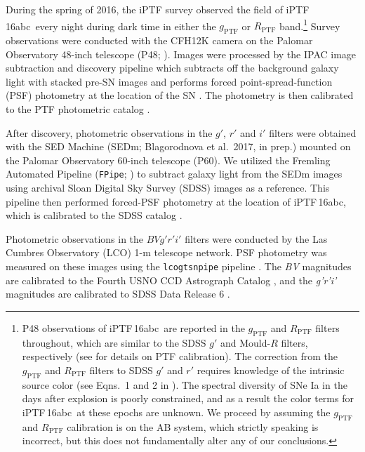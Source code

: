 \documentclass[twocolumn]{aastex61}
\newcommand{\abc}{iPTF\,16abc}
\begin{document}
During the spring of 2016, the iPTF survey observed the field of \abc\ every night during dark time in either the $g_\mathrm{PTF}$ or 
$R_\mathrm{PTF}$ band.\footnote{P48 observations of \abc\ are reported in the $g_\mathrm{PTF}$ and $R_\mathrm{PTF}$ filters throughout, which are similar to the SDSS $g'$ and Mould-$R$ filters, respectively (see \citealt{2012PASP..124..854O} for details on PTF calibration). The correction from the $g_\mathrm{PTF}$ and $R_\mathrm{PTF}$ filters to SDSS $g'$ and $r'$ requires knowledge of the intrinsic source color (see Eqns.~1 and 2 in \citealt{2012PASP..124..854O}). The spectral diversity of SNe Ia in the days after explosion is poorly constrained, and as a result the color terms for \abc\ at these epochs are unknown. We proceed by assuming the $g_\mathrm{PTF}$ and $R_\mathrm{PTF}$ calibration is on the AB system, which strictly speaking is incorrect, but this does not fundamentally alter any of our conclusions.} 
Survey observations were conducted with the
CFH12K camera \citep{2008SPIE.7014E..4YR} on the Palomar Observatory 
48-inch telescope (P48; \citealt{2009PASP..121.1395L}). Images were processed by the IPAC image
subtraction and discovery pipeline which subtracts off the background
galaxy light with stacked pre-SN images and performs forced
point-spread-function (PSF) photometry at the location of the SN 
\citep{2017PASP..129a4002M}. The
photometry is then calibrated to the PTF photometric catalog
\citep{2012PASP..124..854O}.

After discovery, photometric observations in the $g'$, $r'$ and $i'$
filters were obtained with the SED Machine 
(SEDm; Blagorodnova et al.\ 2017, in prep.) mounted on the Palomar Observatory 
60-inch telescope (P60). We utilized the Fremling Automated Pipeline (\texttt{FPipe}; \citealt{2016A&A...593A..68F}) to subtract galaxy light from the SEDm images using archival Sloan Digital Sky Survey (SDSS) images as a reference. This pipeline then performed forced-PSF photometry at the location of \abc, which is calibrated to the SDSS catalog \citep{2014ApJS..211...17A}.

Photometric observations in the $BVg'r'i'$ filters were conducted by the Las Cumbres Observatory (LCO) 1-m
telescope network.  PSF photometry was measured on these images using
the \texttt{lcogtsnpipe} pipeline \citep{2016MNRAS.459.3939V}. The
\textit{BV} magnitudes are calibrated to the Fourth USNO CCD
Astrograph Catalog \citep{2013AJ....145...44Z}, and the \textit{g'r'i'}
magnitudes are calibrated to SDSS Data Release 6
\citep{2008ApJS..175..297A}.
\end{document}
